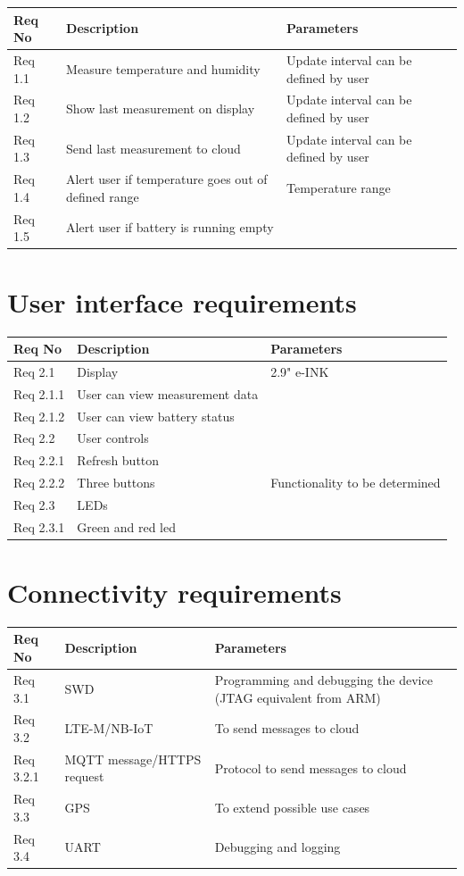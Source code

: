 \documentclass[]{dithesis}
\begin{document}
\begin{tabular}{| l | m{6.5cm} | m{6.5cm} |}
\hline
\textbf{Req No} & \textbf{Description} & \textbf{Parameters}  \\
\hline
Req 1.1 & Measure temperature and humidity & Update interval can be defined by user  \\
\hline
Req 1.2 & Show last measurement on display & Update interval can be defined by user  \\
\hline
Req 1.3 & Send last measurement to cloud & Update interval can be defined by user  \\
\hline
Req 1.4 & Alert user if temperature goes out of defined range & Temperature range  \\
\hline
Req 1.5 & Alert user if battery is running empty & \\
\hline
\end{tabular}

\section{User interface requirements}

\begin{tabular}{| l | m{6.5cm} | m{6.5cm} |}
\hline
\textbf{Req No} & \textbf{Description} & \textbf{Parameters}  \\
\hline
Req 2.1 & Display & 2.9" e-INK  \\
\hline
Req 2.1.1 & User can view measurement data &   \\
\hline
Req 2.1.2 & User can view battery status &  \\
\hline
Req 2.2 & User controls &  \\
\hline
Req 2.2.1 & Refresh button &  \\
\hline
Req 2.2.2 & Three buttons & Functionality to be determined \\
\hline
Req 2.3 & LEDs & \\
\hline
Req 2.3.1 & Green and red led & \\
\hline
\end{tabular}

\section{Connectivity requirements}

\begin{tabular}{| l | m{6.5cm} | m{6.5cm} |}
\hline
\textbf{Req No} & \textbf{Description} & \textbf{Parameters}  \\
\hline
Req 3.1 & SWD & Programming and debugging the device (JTAG equivalent from ARM) \\
\hline
Req 3.2 & LTE-M/NB-IoT & To send messages to cloud  \\
\hline
Req 3.2.1 & MQTT message/HTTPS request & Protocol to send messages to cloud  \\
\hline
Req 3.3 & GPS & To extend possible use cases \\
\hline
Req 3.4 & UART & Debugging and logging \\
\hline
\end{tabular}
\end{document}
